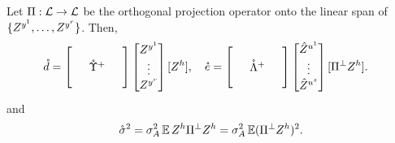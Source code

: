 \documentclass[main.tex]{subfiles}
\begin{document}
\begin{prop}\label{prop:vReExpression}
  Let $\Pi: \mathcal{L} \to \mathcal{L}$ be the orthogonal projection operator onto the linear span of $\{ Z^{y^1}, \ldots,  Z^{y^r}\}$.
  Then,
  \begin{align}
  \mathring{\dme}
    &=
      \begin{bmatrix}
      \phz
        &\phz
          &\phz\\
      \phz
        &\mathring{\Upsilonme }^+
          &\phz\\
      \phz
        &\phz
          &\phz
      \end{bmatrix}
      \begin{bmatrix}
         Z^{\yme^1}\\
        \vdots\\
         Z^{\yme^r}
      \end{bmatrix}
         [Z^{h}]
      ,
      \quad
  \mathring{\eme}
      =
      \begin{bmatrix}
        \phz
          &\phz
            &\phz\\
        \phz
          &\mathring{\Lambdame }^+
            &\phz\\
        \phz
          &\phz
            &\phz
        \end{bmatrix}
        \begin{bmatrix}
          \Zhat^{\ume^1}\\
          \vdots\\
          \Zhat^{\ume^s}
        \end{bmatrix}
        [\Pi^\perp  Z^{h}]
      .
      \label{eqn:xi&zetaLimit}
  \end{align}
  and
  \begin{equation}
    \mathring\sigma^2 = \sigma_A^2 \EV Z^h \Pi^\perp Z^h
      = \sigma_A^2 \EV (\Pi^\perp Z^h)^2
      .
    \label{eqn:sigmalimitPiPerp}
  \end{equation}
  \end{prop}
  
\end{document}
